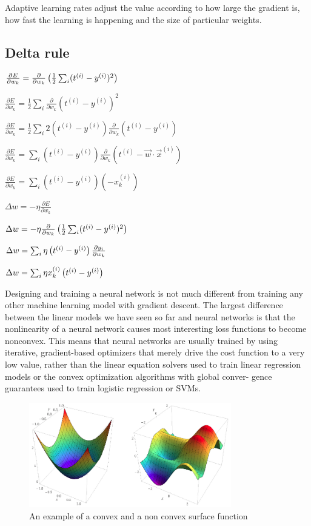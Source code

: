 \documentclass{report}
\begin{document}
Adaptive learning rates adjust the value according to how large the gradient is, how fast the learning is happening and the size of particular weights.

\subsection{Delta rule}

$\frac{\partial E}{\partial w_k} = \frac{\partial}{\partial w_k}\left( \frac{1}{2} \sum_{i}(t^{(i)} - y^{(i)})^2\right)$

$\frac{\partial E}{\partial w_k} =  \frac{1}{2} \sum_{i}\frac{\partial}{\partial w_k}(t^{(i)} - y^{(i)})^2$

$\frac{\partial E}{\partial w_k} = \frac{1}{2} \sum_i 2(t^{(i)} - y^{(i)}) \frac{\partial}{\partial w_k}(t^{(i)} - y^{(i)})$

$\frac{\partial E}{\partial w_k} = \sum_i (t^{(i)} - y^{(i)}) \frac{\partial}{\partial w_k}(t^{(i)} - \vec{w} \cdot \vec{x}^{(i)})$

$\frac{\partial E}{\partial w_k} = \sum_i (t^{(i)} - y^{(i)})(-x^{(i)}_k)$

$\Delta w = -\eta \frac{\partial E}{\partial w_k}$

$\Delta w = -\eta \frac{\partial}{\partial w_k}\left( \frac{1}{2} \sum_i (t^{(i)} - y^{(i)})^2 \right)$

$\Delta w = \sum_i \eta \left(t^{(i)} - y^{(i)}\right)\frac{\partial y_i}{\partial w_k}$

$\Delta w = \sum_i \eta x_k^{(i)}\left(t^{(i)} - y^{(i)}\right)$

Designing and training a neural network is not much different from training any other machine learning model with gradient descent. The largest difference between the linear models we have seen so far and neural networks is that the nonlinearity of a neural network causes most interesting loss functions to become nonconvex. This means that neural networks are usually trained by using iterative, gradient-based optimizers that merely drive the cost function to a very low value, rather than the linear equation solvers used to train linear regression models or the convex optimization algorithms with global conver- gence guarantees used to train logistic regression or SVMs.

\begin{figure}[ht]
	\includegraphics[width=250pt]{8}
	\centering
	\caption{An example of a convex and a non convex surface function}
\end{figure}
\end{document}
